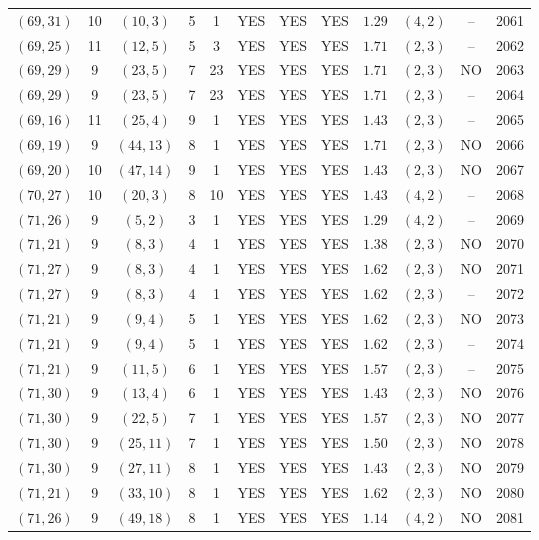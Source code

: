 \begin{longtable}{|c|c|c|c|c|c|c|c|c|c|c|c|}
$(69,31)$ & 10 & $(10,3)$ & 5 & 1 & YES & YES & YES & $1.29$ & $(4,2)$ & -- & 2061\\
$(69,25)$ & 11 & $(12,5)$ & 5 & 3 & YES & YES & YES & $1.71$ & $(2,3)$ & -- & 2062\\
$(69,29)$ & 9 & $(23,5)$ & 7 & 23 & YES & YES & YES & $1.71$ & $(2,3)$ & NO & 2063\\
$(69,29)$ & 9 & $(23,5)$ & 7 & 23 & YES & YES & YES & $1.71$ & $(2,3)$ & -- & 2064\\
$(69,16)$ & 11 & $(25,4)$ & 9 & 1 & YES & YES & YES & $1.43$ & $(2,3)$ & -- & 2065\\
$(69,19)$ & 9 & $(44,13)$ & 8 & 1 & YES & YES & YES & $1.71$ & $(2,3)$ & NO & 2066\\
$(69,20)$ & 10 & $(47,14)$ & 9 & 1 & YES & YES & YES & $1.43$ & $(2,3)$ & NO & 2067\\
$(70,27)$ & 10 & $(20,3)$ & 8 & 10 & YES & YES & YES & $1.43$ & $(4,2)$ & -- & 2068\\
$(71,26)$ & 9 & $(5,2)$ & 3 & 1 & YES & YES & YES & $1.29$ & $(4,2)$ & -- & 2069\\
$(71,21)$ & 9 & $(8,3)$ & 4 & 1 & YES & YES & YES & $1.38$ & $(2,3)$ & NO & 2070\\
$(71,27)$ & 9 & $(8,3)$ & 4 & 1 & YES & YES & YES & $1.62$ & $(2,3)$ & NO & 2071\\
$(71,27)$ & 9 & $(8,3)$ & 4 & 1 & YES & YES & YES & $1.62$ & $(2,3)$ & -- & 2072\\
$(71,21)$ & 9 & $(9,4)$ & 5 & 1 & YES & YES & YES & $1.62$ & $(2,3)$ & NO & 2073\\
$(71,21)$ & 9 & $(9,4)$ & 5 & 1 & YES & YES & YES & $1.62$ & $(2,3)$ & -- & 2074\\
$(71,21)$ & 9 & $(11,5)$ & 6 & 1 & YES & YES & YES & $1.57$ & $(2,3)$ & -- & 2075\\
$(71,30)$ & 9 & $(13,4)$ & 6 & 1 & YES & YES & YES & $1.43$ & $(2,3)$ & NO & 2076\\
$(71,30)$ & 9 & $(22,5)$ & 7 & 1 & YES & YES & YES & $1.57$ & $(2,3)$ & NO & 2077\\
$(71,30)$ & 9 & $(25,11)$ & 7 & 1 & YES & YES & YES & $1.50$ & $(2,3)$ & NO & 2078\\
$(71,30)$ & 9 & $(27,11)$ & 8 & 1 & YES & YES & YES & $1.43$ & $(2,3)$ & NO & 2079\\
$(71,21)$ & 9 & $(33,10)$ & 8 & 1 & YES & YES & YES & $1.62$ & $(2,3)$ & NO & 2080\\
$(71,26)$ & 9 & $(49,18)$ & 8 & 1 & YES & YES & YES & $1.14$ & $(4,2)$ & NO & 2081\\

\end{longtable}
